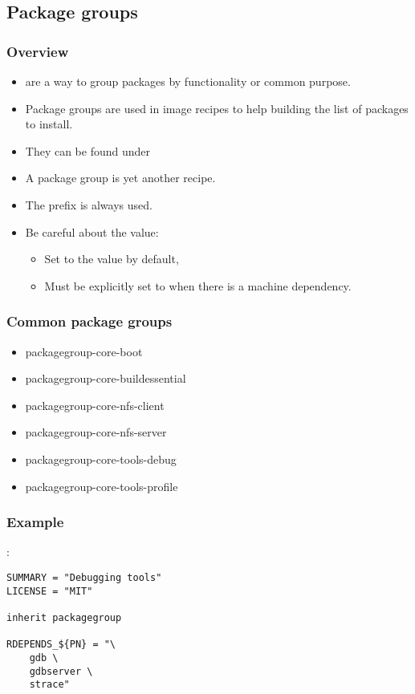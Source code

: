 \subsection{Package groups}

\begin{frame}
  \frametitle{Overview}
  \begin{itemize}
    \item {} are a way to group packages by
      functionality or common purpose.
    \item Package groups are used in image recipes to help building
      the list of packages to install.
    \item They can be found under
    \item A package group is yet another recipe.
    \item The prefix  is always used.
    \item Be careful about the  value:
      \begin{itemize}
      \item Set to the value  by default,
      \item Must be explicitly set to  when there is a machine
        dependency.
      \end{itemize}
  \end{itemize}
\end{frame}

\begin{frame}
  \frametitle{Common package groups}
  \begin{itemize}
    \item packagegroup-core-boot
    \item packagegroup-core-buildessential
    \item packagegroup-core-nfs-client
    \item packagegroup-core-nfs-server
    \item packagegroup-core-tools-debug
    \item packagegroup-core-tools-profile
  \end{itemize}
\end{frame}

\begin{frame}[fragile]
  \frametitle{Example}
  :
  \begin{block}{}
    \begin{verbatim}
SUMMARY = "Debugging tools"
LICENSE = "MIT"

inherit packagegroup

RDEPENDS_${PN} = "\
    gdb \
    gdbserver \
    strace"
    \end{verbatim}
  \end{block}
\end{frame}
